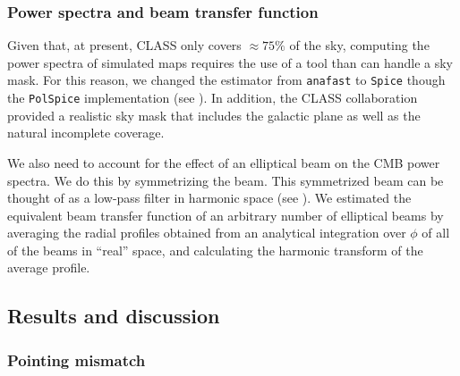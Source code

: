 \documentclass[a4paper,11pt]{article}
\begin{document}
\subsubsection{Power spectra and beam transfer function}


Given that, at present, CLASS only covers $\approx 75\%$ of the sky, computing the power spectra of simulated maps requires the use of a tool than can handle a sky mask. For this reason, we changed the estimator from \texttt{anafast} to \texttt{Spice} though the \texttt{PolSpice} implementation (see \cite{2004MNRAS.350..914C}). In addition, the CLASS collaboration provided a realistic sky mask that includes the galactic plane as well as the natural incomplete coverage. 

We also need to account for the effect of an elliptical beam on the CMB power spectra. We do this by symmetrizing the beam. This symmetrized beam can be thought of as a low-pass filter in harmonic space (see \cite{2003ApJS..148...39P}). We estimated the equivalent beam transfer function of an arbitrary number of elliptical beams by averaging the radial profiles obtained from an analytical integration over $\phi$ of all of the beams in ``real'' space,  and calculating the harmonic transform of the average profile.


\subsection{Results and discussion}

\subsubsection{Pointing mismatch}
\end{document}
